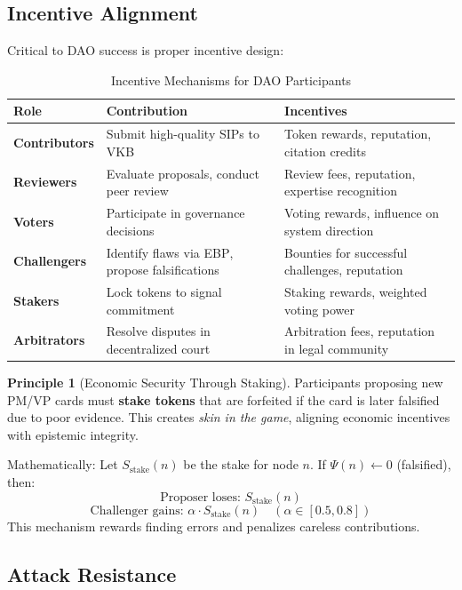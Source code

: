 \documentclass[11pt,a4paper]{article}
\theoremstyle{definition}
\newtheorem{principle}{Principle}[section]
\theoremstyle{remark}
\newcommand{\VKB}{\textsc{VKB}}
\newcommand{\SIP}{\textsc{SIP}}
\newcommand{\EBP}{\textsc{EBP}}
\newcommand{\DAO}{\textsc{DAO}}
\begin{document}
\subsection{Incentive Alignment}

Critical to \DAO{} success is proper incentive design:

\begin{table}[H]
\centering
\caption{Incentive Mechanisms for \DAO{} Participants}
\begin{tabular}{@{}lp{5cm}p{5cm}@{}}
\toprule
\textbf{Role} & \textbf{Contribution} & \textbf{Incentives} \\
\midrule
\textbf{Contributors} & Submit high-quality \SIP{}s to \VKB{} & Token rewards, reputation, citation credits \\
\textbf{Reviewers} & Evaluate proposals, conduct peer review & Review fees, reputation, expertise recognition \\
\textbf{Voters} & Participate in governance decisions & Voting rewards, influence on system direction \\
\textbf{Challengers} & Identify flaws via \EBP{}, propose falsifications & Bounties for successful challenges, reputation \\
\textbf{Stakers} & Lock tokens to signal commitment & Staking rewards, weighted voting power \\
\textbf{Arbitrators} & Resolve disputes in decentralized court & Arbitration fees, reputation in legal community \\
\bottomrule
\end{tabular}
\end{table}

\begin{principle}[Economic Security Through Staking]
Participants proposing new PM/VP cards must \textbf{stake tokens} that are forfeited if the card is later falsified due to poor evidence. This creates \textit{skin in the game}, aligning economic incentives with epistemic integrity.

Mathematically: Let $S_{\text{stake}}(n)$ be the stake for node $n$. If $\Psi(n) \gets 0$ (falsified), then:
\[
\text{Proposer loses: } S_{\text{stake}}(n)
\]
\[
\text{Challenger gains: } \alpha \cdot S_{\text{stake}}(n) \quad (\alpha \in [0.5, 0.8])
\]
This mechanism rewards finding errors and penalizes careless contributions.
\end{principle}

\subsection{Attack Resistance}
\end{document}
